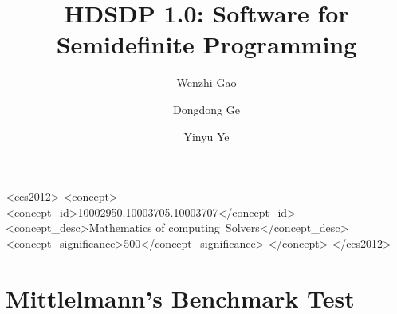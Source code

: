 \documentclass[manuscript,screen,review]{acmart}
\begin{document}
\title{HDSDP 1.0: Software for Semidefinite Programming}

\author{Wenzhi Gao}
\author{Dongdong Ge}
\author{Yinyu Ye}
 
 \begin{CCSXML}
<ccs2012>
   <concept>
       <concept_id>10002950.10003705.10003707</concept_id>
       <concept_desc>Mathematics of computing~Solvers</concept_desc>
       <concept_significance>500</concept_significance>
       </concept>
 </ccs2012>
\end{CCSXML}

 
 
\maketitle












\newpage
\appendix

\section{Mittlelmann's Benchmark Test}

\end{document}
